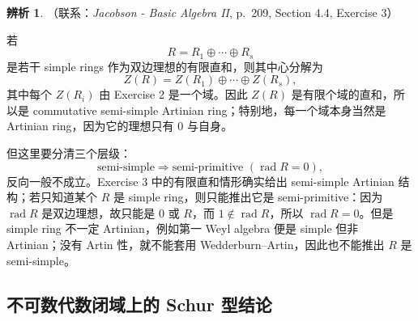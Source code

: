 \documentclass[a4paper]{ctexart}
\theoremstyle{definition}
\theoremstyle{analysis}
\newtheorem{remark}{辨析}[section]
\theoremstyle{plain}
\begin{document}
\begin{remark}
（联系：\textit{Jacobson - Basic Algebra II}, p.~209, Section 4.4, Exercise 3）

若
\[
  R=R_1\oplus\cdots\oplus R_s
\]
是若干 simple rings 作为双边理想的有限直和，则其中心分解为
\[
  Z(R)=Z(R_1)\oplus\cdots\oplus Z(R_s),
\]
其中每个 \(Z(R_i)\) 由 Exercise 2 是一个域。因此 \(Z(R)\) 是有限个域的直和，所以是 commutative semi-simple Artinian ring；特别地，每一个域本身当然是 Artinian ring，因为它的理想只有 \(0\) 与自身。

但这里要分清三个层级：
\[
  \text{semi-simple}
  \Longrightarrow
  \text{semi-primitive }(\operatorname{rad}R=0),
\]
反向一般不成立。Exercise 3 中的有限直和情形确实给出 semi-simple Artinian 结构；若只知道某个 \(R\) 是 simple ring，则只能推出它是 semi-primitive：因为 \(\operatorname{rad}R\) 是双边理想，故只能是 \(0\) 或 \(R\)，而 \(1\notin\operatorname{rad}R\)，所以 \(\operatorname{rad}R=0\)。但是 simple ring 不一定 Artinian，例如第一 Weyl algebra 便是 simple 但非 Artinian；没有 Artin 性，就不能套用 Wedderburn--Artin，因此也不能推出 \(R\) 是 semi-simple。
\end{remark}
\newpage

\subsection{不可数代数闭域上的 Schur 型结论}\label{subsec:problem-schur-uncountable-field}
\end{document}
